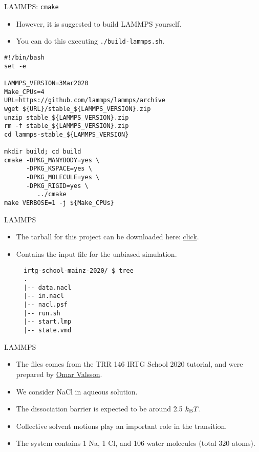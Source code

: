 \documentclass[10pt]{beamer}
\begin{document}
\begin{frame}[fragile]{LAMMPS: \texttt{cmake}}
  \begin{itemize}
    \item However, it is suggested to build LAMMPS yourself.
    \item You can do this executing \texttt{./build-lammps.sh}.
  \end{itemize}
    \begin{lstlisting}
#!/bin/bash
set -e

LAMMPS_VERSION=3Mar2020
Make_CPUs=4
URL=https://github.com/lammps/lammps/archive
wget ${URL}/stable_${LAMMPS_VERSION}.zip
unzip stable_${LAMMPS_VERSION}.zip
rm -f stable_${LAMMPS_VERSION}.zip
cd lammps-stable_${LAMMPS_VERSION}

mkdir build; cd build
cmake -DPKG_MANYBODY=yes \
      -DPKG_KSPACE=yes \
      -DPKG_MOLECULE=yes \
      -DPKG_RIGID=yes \
	     ../cmake
make VERBOSE=1 -j ${Make_CPUs}
    \end{lstlisting}
\end{frame}

\begin{frame}[fragile]{LAMMPS}
  \begin{itemize}
  \setlength\itemsep{1em}
    \item The tarball for this project can be downloaded here: \href{https://ves-code.github.io/doc-v2.7-irtg-school-2020/user-doc/html/tutorial-resources/irtg-school-mainz-2020-metad.tar.gz}{click}.

    \item Contains the input file for the unbiased simulation.

    \begin{lstlisting}
  irtg-school-mainz-2020/ $ tree
  .
  |-- data.nacl
  |-- in.nacl
  |-- nacl.psf
  |-- run.sh
  |-- start.lmp
  |-- state.vmd
    \end{lstlisting}
  \end{itemize}
\end{frame}

\begin{frame}{LAMMPS}
  \begin{itemize}
    \setlength\itemsep{1em}
    \item The files comes from the TRR 146 IRTG School 2020 tutorial, and were prepared by \href{https://www2.mpip-mainz.mpg.de/~valsson/}{Omar Valsson}.
    \item We consider NaCl in aqueous solution.
    \item The dissociation barrier is expected to be around 2.5 $k_\mathrm{B}T$.
    \item Collective solvent motions play an important role in the transition.
    \item The system contains 1 Na, 1 Cl, and 106 water molecules (total 320 atoms).
  \end{itemize}
\end{frame}
\end{document}
